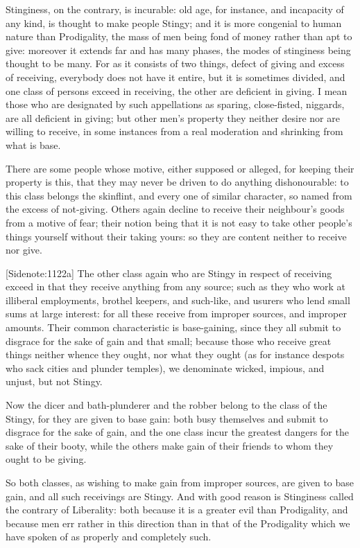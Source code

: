 Stinginess, on the contrary, is incurable: old age, for instance, and
incapacity of any kind, is thought to make people Stingy; and it is more
congenial to human nature than Prodigality, the mass of men being fond
of money rather than apt to give: moreover it extends far and has many
phases, the modes of stinginess being thought to be many. For as it
consists of two things, defect of giving and excess of receiving,
everybody does not have it entire, but it is sometimes divided, and one
class of persons exceed in receiving, the other are deficient in giving.
I mean those who are designated by such appellations as sparing,
close-fisted, niggards, are all deficient in giving; but other men's
property they neither desire nor are willing to receive, in some
instances from a real moderation and shrinking from what is base.

There are some people whose motive, either supposed or alleged, for
keeping their property is this, that they may never be driven to do
anything dishonourable: to this class belongs the skinflint, and every
one of similar character, so named from the excess of not-giving. Others
again decline to receive their neighbour's goods from a motive of fear;
their notion being that it is not easy to take other people's things
yourself without their taking yours: so they are content neither to
receive nor give.

[Sidenote:1122a] The other class again who are Stingy in respect of
receiving exceed in that they receive anything from any source; such as
they who work at illiberal employments, brothel keepers, and such-like,
and usurers who lend small sums at large interest: for all these receive
from improper sources, and improper amounts. Their common characteristic
is base-gaining, since they all submit to disgrace for the sake of gain
and that small; because those who receive great things neither whence
they ought, nor what they ought (as for instance despots who sack cities
and plunder temples), we denominate wicked, impious, and unjust, but not
Stingy.

Now the dicer and bath-plunderer and the robber belong to the class of
the Stingy, for they are given to base gain: both busy themselves and
submit to disgrace for the sake of gain, and the one class incur the
greatest dangers for the sake of their booty, while the others make gain
of their friends to whom they ought to be giving.

So both classes, as wishing to make gain from improper sources, are
given to base gain, and all such receivings are Stingy. And with good
reason is Stinginess called the contrary of Liberality: both because it
is a greater evil than Prodigality, and because men err rather in this
direction than in that of the Prodigality which we have spoken of as
properly and completely such.

